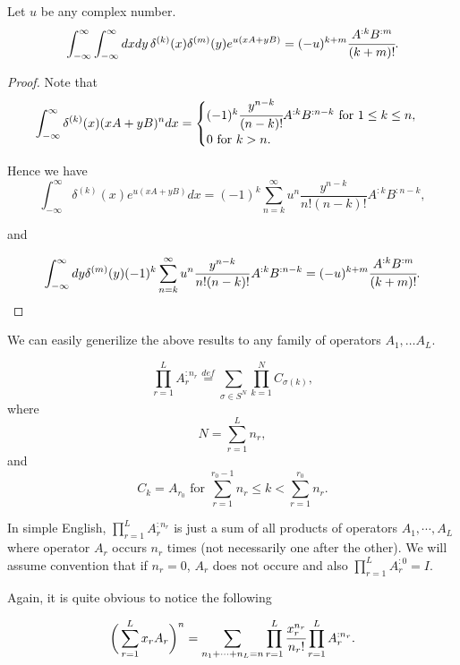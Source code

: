 \documentclass[main.tex]{subfiles}
\begin{document}
\begin{lemma} Let $u$ be any complex number.
\begin{equation}
\int_{-\infty}^{\infty} \int_{-\infty}^{\infty} dx dy\, \delta^{(k)}(x) \delta^{(m)}(y) e^{u(xA + yB)} = (-u)^{k + m}\cfrac{A^{:k}B^{:m}}{(k + m)!}.
\end{equation}
\end{lemma}
\begin{proof}
Note that 
\begin{equation}
\int_{-\infty}^{\infty} \delta^{(k)}(x) (xA + yB)^n dx 
= 
\begin{cases}
(-1)^k \cfrac{y^{n - k}}{(n - k)!} A^{:k}B^{:n-k} \text{ for } 1 \leq k \leq n,\\
0 \text{ for } k > n. 
\end{cases}
\end{equation}

Hence we have
\begin{equation}
\int_{-\infty}^{\infty} \delta^{(k)}(x) e^{u(xA + yB)}dx =
(-1)^k \sum_{n = k}^\infty u^n \frac{y^{n - k}}{n!(n-k)!} A^{:k}B^{:n-k},
\end{equation}

and

\begin{equation}
\int_{-\infty}^\infty dy \delta^{(m)}(y) (-1)^k \sum_{n = k}^\infty u^n \frac{y^{n - k}}{n!(n-k)!} A^{:k}B^{:n-k} = (-u)^{k + m}\cfrac{A^{:k}B^{:m}}{(k + m)!}.
\end{equation}
\end{proof}

We can easily generilize the above results to any family of operators $A_1, \dots A_L$.

\begin{definition}
\begin{equation}
\prod_{r=1}^L A_r^{:n_r} \stackrel{def}{=} \sum_{\sigma\in S^{N}} \prod_{k = 1}^{N} C_{\sigma(k)},
\end{equation}
where
$$N = \sum_{r=1}^L n_r,$$
and
$$C_k = A_{r_0} \text{ for } \sum_{r=1}^{r_0 - 1} n_r \leq k < \sum_{r=1}^{r_0} n_r.$$
\end{definition}

In simple English, $\prod_{r=1}^L A_r^{:n_r}$ is just a sum of all products of operators $A_1, \cdots, A_L$ where operator $A_r$ occurs $n_r$ times (not necessarily one after the other). We will assume convention that if $n_r = 0$, $A_r$ does not occure and also $\prod_{r=1}^L A_r^{:0} = I$.

Again, it is quite obvious to notice the following
\begin{lemma}
\begin{equation}
\bigg( \sum_{r=1}^L x_r A_r \bigg)^n = \sum_{n_1 + \cdots + n_L = n} \prod_{r=1}^L \cfrac{x_r^{n_r}}{n_r!} \prod_{r=1}^L A_r^{:n_r}.
\end{equation}
\end{lemma}
\end{document}
